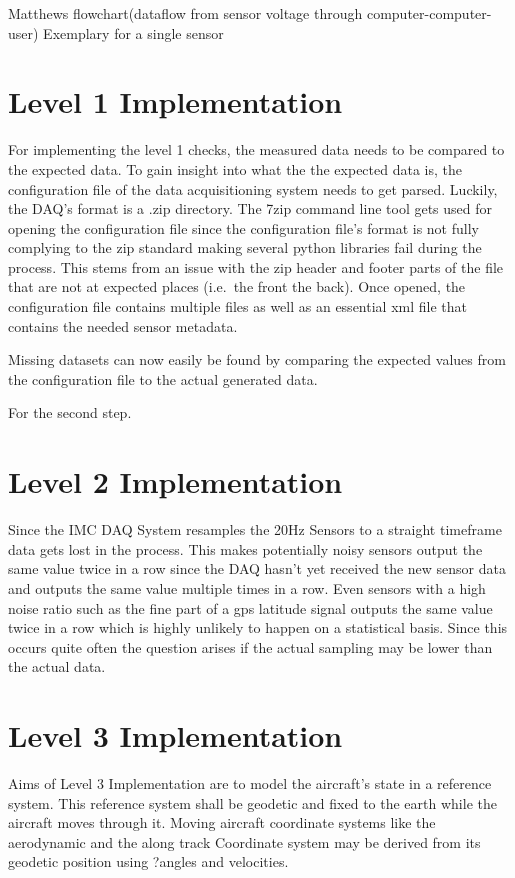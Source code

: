 Matthews flowchart(dataflow from sensor voltage through computer-computer-user)
Exemplary for a single sensor



\section{Level 1 Implementation}

For implementing the level 1 checks, the measured data needs to be compared to the expected data. To gain insight into what the the expected data is, the configuration file of the data acquisitioning system needs to get parsed.
Luckily, the DAQ's format is a .zip directory.
The 7zip command line tool gets used for opening the configuration file since the configuration file's format is not fully complying to the zip standard making several python libraries fail during the process. This stems from an issue with the zip header and footer parts of the file that are not at expected places (i.e.\ the front the back).
Once opened, the configuration file contains multiple files as well as an essential xml file that contains the needed sensor metadata.

Missing datasets can now easily be found by comparing the expected values from the configuration file to the actual generated data.

For the second step.

\section{Level 2 Implementation}

Since the IMC DAQ System resamples the 20Hz Sensors to a straight timeframe data gets lost in the process. This makes potentially noisy sensors output the same value twice in a row since the DAQ hasn't yet received the new sensor data and outputs the same value multiple times in a row. Even sensors with a high noise ratio such as the fine part of a gps latitude signal outputs the same value twice in a row which is highly unlikely to happen on a statistical basis. Since this occurs quite often the question arises if the actual sampling may be lower than the actual data.


\section{Level 3 Implementation}

Aims of Level 3 Implementation are to model the aircraft's state in a reference system.
This reference system shall be geodetic and fixed to the earth while the aircraft moves through it. Moving aircraft coordinate systems like the aerodynamic and the along track Coordinate system may be derived from its geodetic position using ?angles and velocities.


